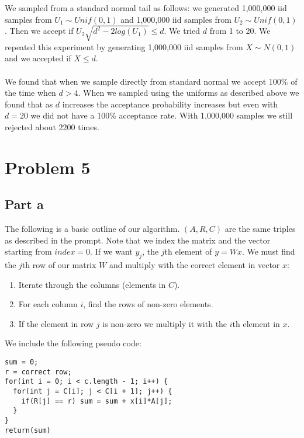 \documentclass{article}\usepackage[]{graphicx}\usepackage[]{color}
\begin{document}
We sampled from a standard normal tail as follows: we generated 1,000,000 iid samples from $U_1 \sim Unif(0,1)$ and 1,000,000 iid samples from $U_2 \sim Unif(0,1)$.  Then we accept if $U_2 \sqrt{d^2 - 2log(U_1)} \le d$.  We tried $d$ from 1 to 20.  We repeated this experiment by generating 1,000,000 iid samples from $X \sim N(0,1)$ and we accepted if $X \le d$.  \\
\\
We found that when we sample directly from standard normal we accept 100$\%$ of the time when $d > 4$.  When we sampled using the uniforms as described above we found that as $d$ increases the acceptance probability increases but even with $d = 20$ we did not have a 100$\%$ acceptance rate.  With 1,000,000 samples we still rejected about 2200 times.

\section*{Problem 5}
\subsection*{Part a}
The following is a basic outline of our algorithm.  $(A,R,C)$ are the same triples as described in the prompt.  Note that we index the matrix and the vector starting from $index = 0$.  If we want $y_j$, the $j$th element of $y = Wx$.  We must find the $j$th row of our matrix $W$ and multiply with the correct element in vector $x$:
\begin{enumerate}
\item Iterate through the columns (elements in $C$).
\item For each column $i$, find the rows of non-zero elements.
\item If the element in row $j$ is non-zero we multiply it with the $i$th element in $x$.
\end{enumerate}
We include the following pseudo code:
\begin{verbatim}
sum = 0;
r = correct row;
for(int i = 0; i < c.length - 1; i++) {
  for(int j = C[i]; j < C[i + 1]; j++) {
    if(R[j] == r) sum = sum + x[i]*A[j];
  }
}
return(sum)
\end{verbatim}
\end{document}
